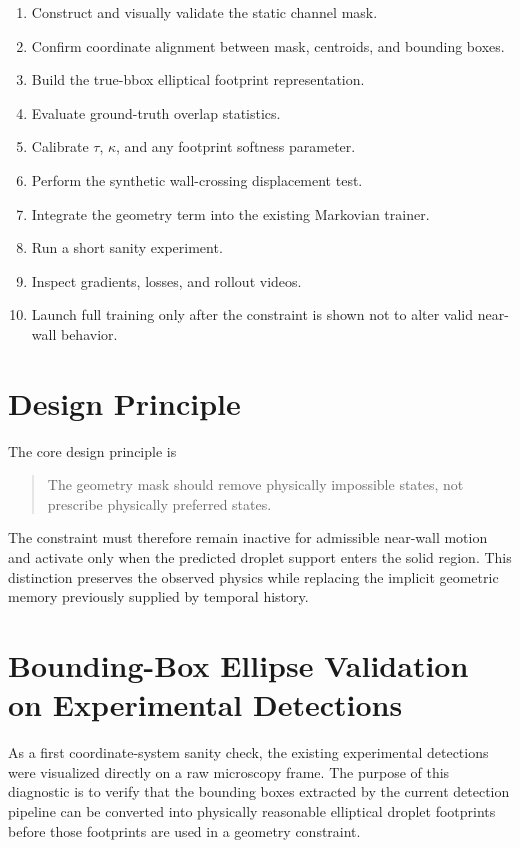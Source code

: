 \documentclass[11pt]{article}
\begin{document}
\begin{enumerate}[leftmargin=1.8em]
    \item Construct and visually validate the static channel mask.
    \item Confirm coordinate alignment between mask, centroids, and bounding boxes.
    \item Build the true-bbox elliptical footprint representation.
    \item Evaluate ground-truth overlap statistics.
    \item Calibrate $\tau$, $\kappa$, and any footprint softness parameter.
    \item Perform the synthetic wall-crossing displacement test.
    \item Integrate the geometry term into the existing Markovian trainer.
    \item Run a short sanity experiment.
    \item Inspect gradients, losses, and rollout videos.
    \item Launch full training only after the constraint is shown not to alter valid near-wall behavior.
\end{enumerate}

\section{Design Principle}

The core design principle is

\begin{quote}
The geometry mask should remove physically impossible states, not prescribe physically preferred states.
\end{quote}

The constraint must therefore remain inactive for admissible near-wall motion and activate only when the predicted droplet support enters the solid region. This distinction preserves the observed physics while replacing the implicit geometric memory previously supplied by temporal history.

\section{Bounding-Box Ellipse Validation on Experimental Detections}

As a first coordinate-system sanity check, the existing experimental detections were visualized directly on a raw microscopy frame. The purpose of this diagnostic is to verify that the bounding boxes extracted by the current detection pipeline can be converted into physically reasonable elliptical droplet footprints before those footprints are used in a geometry constraint.
\end{document}
